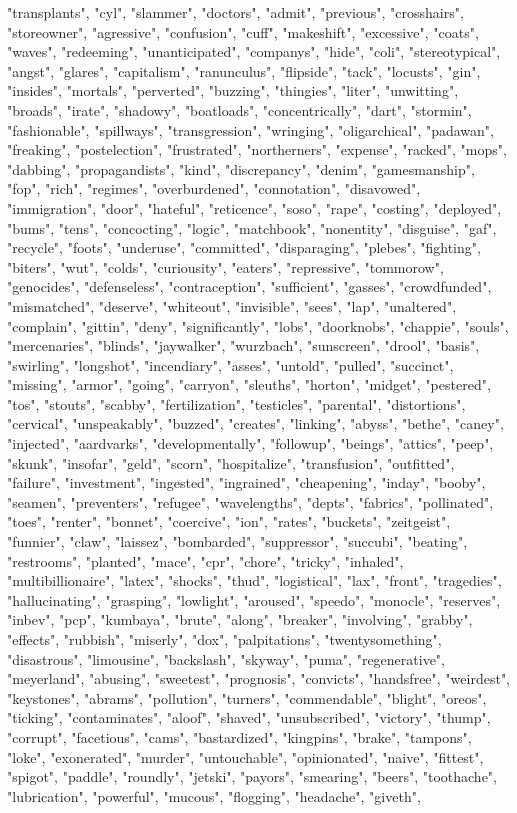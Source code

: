 "transplants", "cyl", "slammer", "doctors", "admit", "previous", "crosshairs", "storeowner", "agressive", "confusion", "cuff", "makeshift", "excessive", "coats", "waves", "redeeming", "unanticipated", "companys", "hide", "coli", "stereotypical", "angst", "glares", "capitalism", "ranunculus", "flipside", "tack", "locusts", "gin", "insides", "mortals", "perverted", "buzzing", "thingies", "liter", "unwitting", "broads", "irate", "shadowy", "boatloads", "concentrically", "dart", "stormin", "fashionable", "spillways", "transgression", "wringing", "oligarchical", "padawan", "freaking", "postelection", "frustrated", "northerners", "expense", "racked", "mops", "dabbing", "propagandists", "kind", "discrepancy", "denim", "gamesmanship", "fop", "rich", "regimes", "overburdened", "connotation", "disavowed", "immigration", "door", "hateful", "reticence", "soso", "rape", "costing", "deployed", "bums", "tens", "concocting", "logic", "matchbook", "nonentity", "disguise", "gaf", "recycle", "foots", "underuse", "committed", "disparaging", "plebes", "fighting", "biters", "wut", "colds", "curiousity", "eaters", "repressive", "tommorow", "genocides", "defenseless", "contraception", "sufficient", "gasses", "crowdfunded", "mismatched", "deserve", "whiteout", "invisible", "sees", "lap", "unaltered", "complain", "gittin", "deny", "significantly", "lobs", "doorknobs", "chappie", "souls", "mercenaries", "blinds", "jaywalker", "wurzbach", "sunscreen", "drool", "basis", "swirling", "longshot", "incendiary", "asses", "untold", "pulled", "succinct", "missing", "armor", "going", "carryon", "sleuths", "horton", "midget", "pestered", "tos", "stouts", "scabby", "fertilization", "testicles", "parental", "distortions", "cervical", "unspeakably", "buzzed", "creates", "linking", "abyss", "bethe", "caney", "injected", "aardvarks", "developmentally", "followup", "beings", "attics", "peep", "skunk", "insofar", "geld", "scorn", "hospitalize", "transfusion", "outfitted", "failure", "investment", "ingested", "ingrained", "cheapening", "inday", "booby", "seamen", "preventers", "refugee", "wavelengths", "depts", "fabrics", "pollinated", "toes", "renter", "bonnet", "coercive", "ion", "rates", "buckets", "zeitgeist", "funnier", "claw", "laissez", "bombarded", "suppressor", "succubi", "beating", "restrooms", "planted", "mace", "cpr", "chore", "tricky", "inhaled", "multibillionaire", "latex", "shocks", "thud", "logistical", "lax", "front", "tragedies", "hallucinating", "grasping", "lowlight", "aroused", "speedo", "monocle", "reserves", "inbev", "pcp", "kumbaya", "brute", "along", "breaker", "involving", "grabby", "effects", "rubbish", "miserly", "dox", "palpitations", "twentysomething", "disastrous", "limousine", "backslash", "skyway", "puma", "regenerative", "meyerland", "abusing", "sweetest", "prognosis", "convicts", "handsfree", "weirdest", "keystones", "abrams", "pollution", "turners", "commendable", "blight", "oreos", "ticking", "contaminates", "aloof", "shaved", "unsubscribed", "victory", "thump", "corrupt", "facetious", "cams", "bastardized", "kingpins", "brake", "tampons", "loke", "exonerated", "murder", "untouchable", "opinionated", "naive", "fittest", "spigot", "paddle", "roundly", "jetski", "payors", "smearing", "beers", "toothache", "lubrication", "powerful", "mucous", "flogging", "headache", "giveth", 